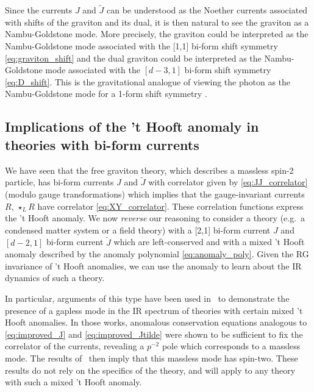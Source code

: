 Since the currents $J$ and $\tilde{J}$ can be understood as the Noether currents associated with shifts of the graviton and its dual, it is then natural to see the graviton as a Nambu-Goldstone mode. More precisely, the graviton could be interpreted as the Nambu-Goldstone mode associated with the [1,1] bi-form shift symmetry \eqref{eq:graviton_shift} and the dual graviton could be interpreted as the Nambu-Goldstone mode associated with the $[d-3,1]$ bi-form shift symmetry \eqref{eq:D_shift}.
This is the gravitational analogue of viewing the photon as the Nambu-Goldstone mode for a 1-form shift symmetry \cite{Gaiotto2015GeneralizedSymmetries}.

\subsection{Implications of the 't Hooft anomaly in theories with bi-form currents}

We have seen that the free graviton theory, which describes a massless spin-2 particle, has bi-form currents $J$ and $\tilde{J}$ with correlator given by \eqref{eq:JJ_correlator} (modulo gauge transformations) which implies that the gauge-invariant currents $R$, $\star_L R$ have correlator \eqref{eq:XY_correlator}.
These correlation functions express the 't Hooft anomaly. 
We now \emph{reverse} our reasoning to consider a theory (e.g.\ a condensed matter system or a field theory) with a [2,1] bi-form current $J$ and $[d-2,1]$ bi-form current $\tilde{J}$ which are left-conserved and with a mixed 't Hooft anomaly described by the anomaly polynomial \eqref{eq:anomaly_poly}. Given the RG invariance of 't Hooft anomalies, we can use the anomaly to learn about the IR dynamics of such a theory.


In particular, arguments of this type have been used in~\cite{Delacretaz:2019brr, Hinterbichler2023GravitySymmetries, Hinterbichler:2024cxn} to demonstrate the presence of a gapless mode in the IR spectrum of theories with certain mixed 't Hooft anomalies. In those works, anomalous conservation equations analogous to \eqref{eq:improved_J} and \eqref{eq:improved_Jtilde} were shown to be sufficient to fix the correlator of the currents, revealing a $p^{-2}$ pole which corresponds to a massless mode. 
The results of~\cite{Weinberg:2020nsn, Distler:2020fzr} then imply that this massless mode has spin-two. These results do not rely on the specifics of the theory, and will apply to any theory with such a mixed 't Hooft anomaly.

